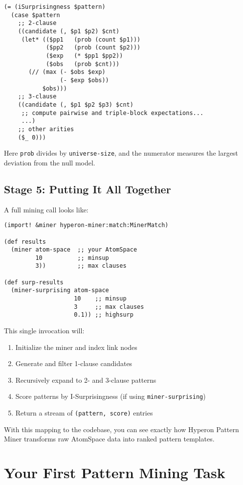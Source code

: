 \documentclass{article}
\begin{document}
\begin{verbatim}
(= (iSurprisingness $pattern)
  (case $pattern
    ;; 2-clause
    ((candidate (, $p1 $p2) $cnt)
     (let* (($pp1   (prob (count $p1)))
            ($pp2   (prob (count $p2)))
            ($exp   (* $pp1 $pp2))
            ($obs   (prob $cnt)))
       (// (max (- $obs $exp)
                (- $exp $obs))
           $obs)))
    ;; 3-clause
    ((candidate (, $p1 $p2 $p3) $cnt)
     ;; compute pairwise and triple-block expectations...
     ...)
    ;; other arities
    ($_ 0)))
\end{verbatim}

\noindent
Here \texttt{prob} divides by \texttt{universe-size}, and the numerator measures the largest deviation from the null model.

\subsection{Stage 5: Putting It All Together}

A full mining call looks like:

\begin{verbatim}
(import! &miner hyperon-miner:match:MinerMatch)

(def results
  (miner atom-space  ;; your AtomSpace
         10          ;; minsup
         3))         ;; max clauses

(def surp-results
  (miner-surprising atom-space
                    10    ;; minsup
                    3     ;; max clauses
                    0.1)) ;; highsurp
\end{verbatim}

This single invocation will:

\begin{enumerate}
  \item Initialize the miner and index link nodes
  \item Generate and filter 1-clause candidates
  \item Recursively expand to 2- and 3-clause patterns
  \item Score patterns by I-Surprisingness (if using \texttt{miner-surprising})
  \item Return a stream of \texttt{(pattern, score)} entries
\end{enumerate}

With this mapping to the codebase, you can see exactly how Hyperon Pattern Miner transforms raw AtomSpace data into ranked pattern templates.


\section{Your First Pattern Mining Task}
\end{document}
